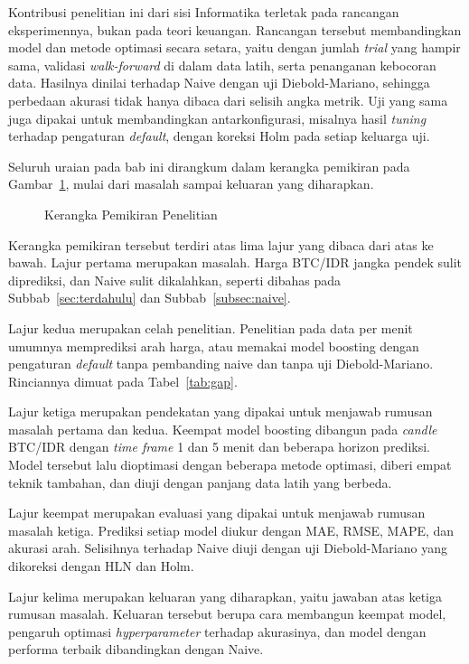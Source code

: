 Kontribusi penelitian ini dari sisi Informatika terletak pada rancangan
eksperimennya, bukan pada teori keuangan. Rancangan tersebut membandingkan
model dan metode optimasi secara setara, yaitu dengan jumlah \textit{trial}
yang hampir sama, validasi \textit{walk-forward} di dalam data latih, serta penanganan
kebocoran data. Hasilnya dinilai terhadap Naive dengan uji
Diebold-Mariano, sehingga perbedaan akurasi tidak hanya dibaca dari selisih
angka metrik. Uji yang sama juga dipakai untuk membandingkan antarkonfigurasi,
misalnya hasil \textit{tuning} terhadap pengaturan \textit{default}, dengan
koreksi Holm pada setiap keluarga uji.

Seluruh uraian pada bab ini dirangkum dalam kerangka pemikiran pada
Gambar~\ref{fig:kerangka}, mulai dari masalah sampai keluaran yang diharapkan.

\begin{figure}[!htbp]
  \centering
  \caption{Kerangka Pemikiran Penelitian}
  \label{fig:kerangka}
\end{figure}

Kerangka pemikiran tersebut terdiri atas lima lajur yang dibaca dari atas ke bawah. Lajur pertama merupakan masalah.
Harga BTC/IDR jangka pendek sulit diprediksi, dan Naive sulit dikalahkan,
seperti dibahas pada Subbab~\ref{sec:terdahulu} dan Subbab~\ref{subsec:naive}.

Lajur kedua merupakan celah penelitian. Penelitian pada data per menit
umumnya memprediksi arah harga, atau memakai model boosting dengan pengaturan
\textit{default} tanpa pembanding naive dan tanpa uji Diebold-Mariano.
Rinciannya dimuat pada Tabel~\ref{tab:gap}.

Lajur ketiga merupakan pendekatan yang dipakai untuk menjawab rumusan masalah
pertama dan kedua. Keempat model boosting dibangun pada \textit{candle}
BTC/IDR dengan \textit{time frame} 1 dan 5 menit dan beberapa horizon
prediksi. Model tersebut lalu dioptimasi dengan beberapa metode optimasi,
diberi empat teknik tambahan, dan diuji dengan panjang data latih yang
berbeda.

Lajur keempat merupakan evaluasi yang dipakai untuk menjawab rumusan masalah
ketiga. Prediksi setiap model diukur dengan MAE, RMSE, MAPE, dan akurasi arah.
Selisihnya terhadap Naive diuji dengan uji Diebold-Mariano yang dikoreksi
dengan HLN dan Holm.

Lajur kelima merupakan keluaran yang diharapkan, yaitu jawaban atas ketiga
rumusan masalah. Keluaran tersebut berupa cara membangun keempat model,
pengaruh optimasi \textit{hyperparameter} terhadap akurasinya, dan model
dengan performa terbaik dibandingkan dengan Naive.
